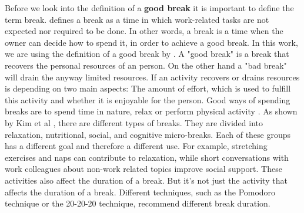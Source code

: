 \documentclass{hasel_thesis}
\begin{document}







Before we look into the definition of a \textbf{good break} it is important to define the term break. \cite{Trougakos.2009} defines a break as a time in which work-related tasks are not expected nor required to be done. In other words, a break is a time when the owner can decide how to spend it, in order to achieve a good break. In this work, we are using the definition of a good break by \cite{Trougakos.2009}. A "good break" is a break that recovers the personal resources of an person. On the other hand a "bad break" will drain the anyway limited resources. If an activity recovers or drains resources is depending on two main aspects: The amount of effort, which is used to fulfill this activity and whether it is enjoyable for the person. Good ways of spending breaks are to spend time in nature, relax or perform physical activity \cite{Bloom.2014} \cite{Largo-Wight.2017}.  As shown by Kim et al \cite{KimS.ParkY.&Niu.2017}, there are different types of breaks. They are divided into relaxation, nutritional, social, and cognitive micro-breaks. Each of these groups has a different goal and therefore a different use. For example, stretching exercises and naps can contribute to relaxation, while short conversations with work colleagues about non-work related topics improve social support. These activities also affect the duration of a break. But it's not just the activity that affects the duration of a break. Different techniques, such as the Pomodoro technique or the 20-20-20 technique, recommend different break duration.
\end{document}
